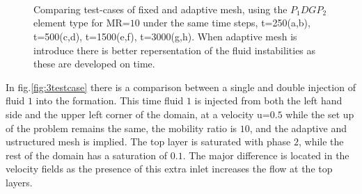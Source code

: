 \documentclass[preprint,authoryear,12pt]{elsarticle}
\begin{document}
\begin{figure}[H]
\begin{center}
{}%
\\ 
\\
\\
\end{center}
\caption{Comparing test-cases of fixed and adaptive mesh, using the $P_{1}DGP_{2}$ element type for MR=$10$ under the same time steps, t=250(a,b), t=500(c,d), t=1500(e,f), t=3000(g,h). When adaptive mesh is introduce there is better repersentation of the fluid instabilities as these are developed on time. }
\label{fig:2testcase}
\end{figure}

In fig.\ref{fig:3testcase} there is a comparison between a single and double injection of fluid $1$ into the formation. This time fluid $1$ is injected from both the left hand side and the upper left corner of the domain, at a velocity u=$0.5$ while the set up of the problem remains the same, the mobility ratio is $10$, and the adaptive and ustructured mesh is implied. The top layer is saturated with phase $2$, while the rest of the domain has a saturation of $0.1$. The major difference is located in the velocity fields as the presence of this extra inlet increases the flow at the top layers.
\end{document}
